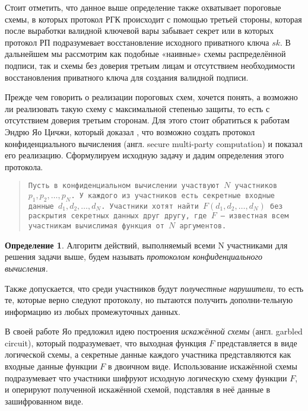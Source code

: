 \documentclass[a4paper,12pt]{article}
\theoremstyle{definition}
\newtheorem{defn}{Определение}
\begin{document}
	Стоит отметить, что данное выше определение также охватывает пороговые схемы, в которых протокол РГК происходит с помощью третьей стороны, которая после выработки валидной ключевой вары забывает секрет или в которых протокол РП подразумевает восстановление исходного приватного ключа $sk$. В дальнейшем мы рассмотрим как подобные «наивные» схемы распределённой подписи, так и схемы без доверия третьим лицам и отсутствием необходимости восстановления приватного ключа для создания валидной подписи.
	
	Прежде чем говорить о реализации пороговых схем, хочется понять, а возможно ли реализовать такую схему с максимальной степенью защиты, то есть с отсутствием доверия третьим сторонам. Для этого стоит обратиться к работам Эндрю Яо Цичжи, который доказал \cite{paper2}, что возможно создать протокол конфиденциального вычисления (англ. secure multi-party computation) и показал его реализацию. Сформулируем исходную задачу и дадим определения этого протокола.

	\begin{quote}
	\texttt{Пусть в конфиденциальном вычислении участвуют $N$ участников $p_1, p_2, \dots, p_N$. У каждого из участников есть секретные входные данные $d_1, d_2, \dots, d_N$. Участники хотят найти $F(d_1, d_2, \dots, d_N)$  без раскрытия секретных данных друг другу, где $F$ \--- известная всем участникам вычислимая функция от $N$ аргументов. }
	\end{quote}

	\begin{defn}\label{def:Tconf}	
	Алгоритм действий, выполняемый всеми N участниками для решения задачи выше, будем называть \emph{протоколом конфиденциального вычисления.}
	\end{defn}
	
	Также допускается, что среди участников будут \emph{получестные нарушители}, то есть те, которые верно следуют протоколу, но пытаются получить дополни-тельную информацию из любых промежуточных данных.
	
	В своей работе Яо предложил идею построения \emph{искажённой схемы} (англ. garbled circuit), который подразумевает, что выходная функция $F$ представляется в виде логической схемы, а секретные данные каждого участника представляются как входные данные функции $F$ в двоичном виде. Использование искажённой схемы подразумевает что участники шифруют исходную логическую схему функции $F$, и оперируют полученной искажённой схемой, подставляя в неё данные в зашифрованном виде. 
	
\end{document}
